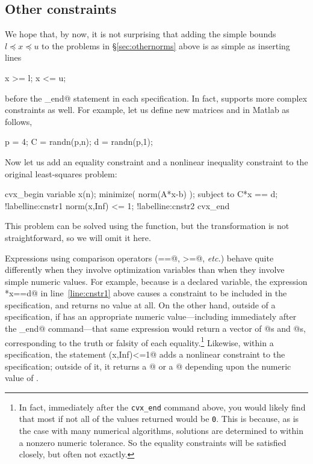 \documentclass[12pt]{article}
\begin{document}
\subsection{Other constraints}
\label{sec:constraints}

We hope that, by now, it is not surprising that adding the simple bounds 
$l\preceq x\preceq u$ to the problems in \S\ref{sec:othernorms} above
is as simple as inserting
lines
\begin{code}
	x >= l;
	x <= u;
\end{code}
before the \verb@cvx_end@
statement in each \cvx specification. In fact, 
\cvx supports more complex constraints as well.
For example, let us define new matrices \verb@C@ and \verb@d@ in Matlab
as follows,
\begin{code2}[firstnumber=227]
	p = 4;
	C = randn(p,n);
	d = randn(p,1);
\end{code2}
Now let us add an equality constraint and a nonlinear inequality
constraint to the original least-squares problem:
\begin{code2}[firstnumber=232]
	cvx_begin
	    variable x(n);
	    minimize( norm(A*x-b) );
	    subject to
	        C*x == d;		!label{line:cnstr1}
	        norm(x,Inf) <= 1;	!label{line:cnstr2}
	cvx_end
\end{code2}
This problem can be solved using the \verb@quadprog@ function,
but the transformation is not straightforward, so
we will omit it here.

Expressions using comparison operators (\verb@==@, \verb@>=@, \emph{etc.})
behave quite differently when they involve \cvx optimization variables
than when they involve simple numeric values. For example, because \verb@x@
is a declared variable, the expression \verb@C*x==d@ in line~\ref{line:cnstr1}
above causes a constraint to be included in the \cvx specification,
and returns no value at all. 
On the other hand, outside of a \cvx specification,
if \verb@x@ has an appropriate numeric value---including immediately after
the \verb@cvx_end@ command---that same expression would return a vector of
@s and @s, corresponding to the truth or falsity of each 
equality.\footnote{In fact, immediately after the
\texttt{cvx\_end} command above, you would likely find that most if not
all of the values returned would be \texttt{0}. This
is because, as is the case with many numerical algorithms, solutions 
are determined to within a nonzero numeric tolerance. So the equality constraints
will be satisfied closely, but often not exactly.} Likewise, within
a \cvx specification, the statement \verb@norm(x,Inf)<=1@ adds a
nonlinear constraint to the specification; outside of it, it
returns a @ or a @ depending upon the numeric value of \verb@x@.
\end{document}

